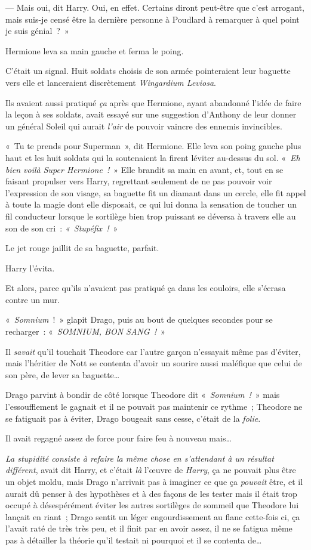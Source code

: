 --- Mais oui, dit Harry. Oui, en effet. Certains diront peut-être que c'est arrogant, mais suis-je censé être la dernière personne à Poudlard à remarquer à quel point je suis génial~?~»

Hermione leva sa main gauche et ferma le poing.

C'était un signal. Huit soldats choisis de son armée pointeraient leur baguette vers elle et lanceraient discrètement \emph{Wingardium Leviosa}.

Ils avaient aussi pratiqué \emph{ça} après que Hermione, ayant abandonné l'idée de faire la leçon à ses soldats, avait essayé sur une suggestion d'Anthony de leur donner un général Soleil qui aurait \emph{l'air} de pouvoir vaincre des ennemis invincibles.

«~Tu te prends pour Superman~», dit Hermione. Elle leva son poing gauche plus haut et les huit soldats qui la soutenaient la firent léviter au-dessus du sol. «~\emph{Eh bien voilà Super Hermione~!}~» Elle brandit sa main en avant, et, tout en se faisant propulser vers Harry, regrettant seulement de ne pas pouvoir voir l'expression de son visage, sa baguette fit un diamant dans un cercle, elle fit appel à toute la magie dont elle disposait, ce qui lui donna la sensation de toucher un fil conducteur lorsque le sortilège bien trop puissant se déversa à travers elle au son de son cri~: \emph{«~Stupéfix~!}~»

Le jet rouge jaillit de sa baguette, parfait.

Harry l'évita.

Et alors, parce qu'ils n'avaient pas pratiqué ça dans les couloirs, elle s'écrasa contre un mur.

\later

«~\emph{Somnium}~!~» glapit Drago, puis au bout de quelques secondes pour se recharger~: «~\emph{SOMNIUM, BON SANG~!}~»

Il \emph{savait} qu'il touchait Theodore car l'autre garçon n'essayait même pas d'éviter, mais l'héritier de Nott se contenta d'avoir un sourire aussi maléfique que celui de son père, de lever sa baguette…

Drago parvint à bondir de côté lorsque Theodore dit «~\emph{Somnium~!}~» mais l'essoufflement le gagnait et il ne pouvait pas maintenir ce rythme~; Theodore ne se fatiguait pas à éviter, Drago bougeait sans cesse, c'était de la \emph{folie}.

Il avait regagné assez de force pour faire feu à nouveau mais…

\emph{La stupidité consiste à refaire la même chose en s'attendant à un résultat différent}, avait dit Harry, et c'était \emph{là} l'œuvre de \emph{Harry}, ça ne pouvait plus être un objet moldu, mais Drago n'arrivait pas à imaginer ce que ça \emph{pouvait} être, et il aurait dû penser à des hypothèses et à des façons de les tester mais il était trop occupé à désespérément éviter les autres sortilèges de sommeil que Theodore lui lançait en riant~; Drago sentit un léger engourdissement au flanc cette-fois ci, ça l'avait raté de très très peu, et il finit par en avoir assez, il ne se fatigua même pas à détailler la théorie qu'il testait ni pourquoi et il se contenta de…

